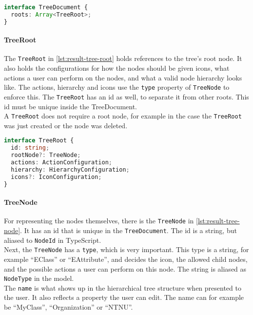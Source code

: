 \begin{lstlisting}[language=Typescript, label={lst:result-tree-document}, caption={[TreeDocument]TreeDocument TypeScript code.}]
interface TreeDocument {
  roots: Array<TreeRoot>;
}
\end{lstlisting}

\paragraph{TreeRoot}
The \texttt{TreeRoot} in \cref{lst:result-tree-root} holds references to the tree's root node.
It also holds the configurations for how the nodes should be given icons, what actions a user can perform on the nodes, and what a valid node hierarchy looks like.
The actions, hierarchy and icons use the \texttt{type} property of \texttt{TreeNode} to enforce this.
The \texttt{TreeRoot} has an id as well, to separate it from other roots.
This id must be unique inside the TreeDocument.\\

A \texttt{TreeRoot} does not require a root node, for example in the case the \texttt{TreeRoot} was just created or the node was deleted.

\begin{lstlisting}[language=Typescript, label={lst:result-tree-root}, caption={[TreeRoot]TreeRoot TypeScript code.}]
interface TreeRoot {
  id: string;
  rootNode?: TreeNode;
  actions: ActionConfiguration;
  hierarchy: HierarchyConfiguration;
  icons?: IconConfiguration;
}
\end{lstlisting}


\paragraph{TreeNode}
For representing the nodes themselves, there is the \texttt{TreeNode} in \cref{lst:result-tree-node}.
It has an id that is unique in the \texttt{TreeDocument}.
The id is a string, but aliased to \texttt{NodeId} in \gls{TypeScript}.\\

Next, the \texttt{TreeNode} has a \texttt{type}, which is very important.
This type is a string, for example ``EClass'' or ``EAttribute'', and decides the icon, the allowed child nodes, and the possible actions a user can perform on this node.
The string is aliased as \texttt{NodeType} in the model.\\

The \texttt{name} is what shows up in the hierarchical tree structure when presented to the user.
It also reflects a property the user can edit.
The name can for example be ``MyClass'', ``Organization'' or ``NTNU''.\\

